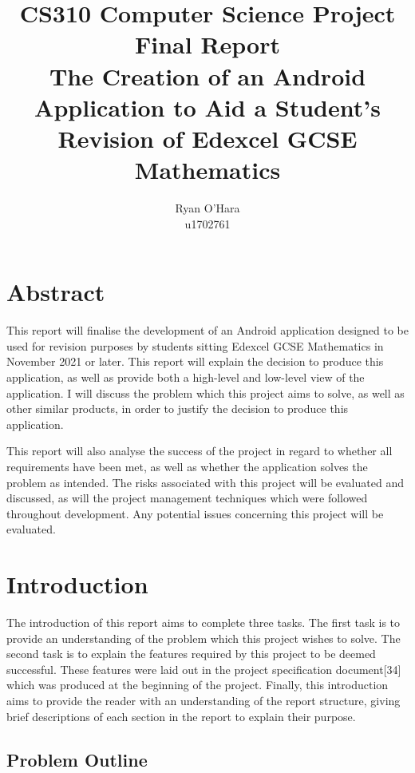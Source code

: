 \documentclass{article}
\title{CS310 Computer Science Project \\ Final Report \\ The Creation of an Android Application to Aid a Student's Revision of Edexcel GCSE Mathematics}
\author{Ryan O'Hara \\ u1702761}
\begin{document}
\maketitle

\newpage

\tableofcontents

\newpage

\section{Abstract}
\label{section:abstract}

This report will finalise the development of an Android application designed to be used for revision purposes by students sitting Edexcel GCSE Mathematics in November 2021 or later. This report will explain the decision to produce this application, as well as provide both a high-level and low-level view of the application. I will discuss the problem which this project aims to solve, as well as other similar products, in order to justify the decision to produce this application. \par

This report will also analyse the success of the project in regard to whether all requirements have been met, as well as whether the application solves the problem as intended. The risks associated with this project will be evaluated and discussed, as will the project management techniques which were followed throughout development. Any potential issues concerning this project will be evaluated. \par

\section{Introduction}
\label{section:introduction}

The introduction of this report aims to complete three tasks. The first task is to provide an understanding of the problem which this project wishes to solve. The second task is to explain the features required by this project to be deemed successful. These features were laid out in the project specification document[34] which was produced at the beginning of the project. Finally, this introduction aims to provide the reader with an understanding of the report structure, giving brief descriptions of each section in the report to explain their purpose.

\subsection{Problem Outline}
\end{document}
